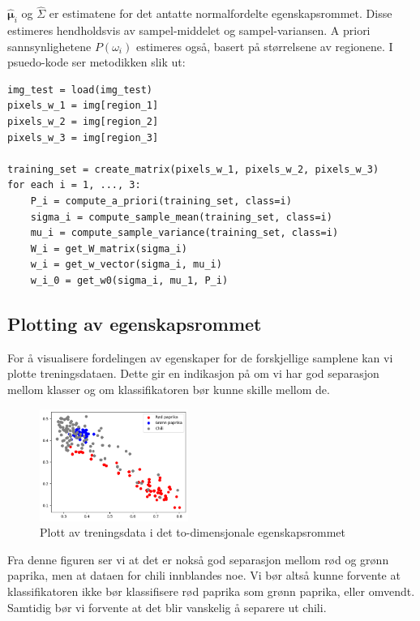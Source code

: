 \documentclass{article}
\begin{document}
$\hat{\pmb{\mu}}_i$ og $\hat{\Sigma}$ er estimatene for det antatte normalfordelte egenskapsrommet. Disse estimeres hendholdsvis av 
sampel-middelet og sampel-variansen. A priori sannsynlighetene $P(\omega_i)$ estimeres også, basert på størrelsene av regionene.
I psuedo-kode ser metodikken slik ut:
\begin{verbatim}
img_test = load(img_test)
pixels_w_1 = img[region_1]
pixels_w_2 = img[region_2]
pixels_w_3 = img[region_3]

training_set = create_matrix(pixels_w_1, pixels_w_2, pixels_w_3)
for each i = 1, ..., 3:
    P_i = compute_a_priori(training_set, class=i)
    sigma_i = compute_sample_mean(training_set, class=i)
    mu_i = compute_sample_variance(training_set, class=i)
    W_i = get_W_matrix(sigma_i)
    w_i = get_w_vector(sigma_i, mu_i)
    w_i_0 = get_w0(sigma_i, mu_1, P_i)
\end{verbatim}

\newpage
\subsection*{Plotting av egenskapsrommet}
For å visualisere fordelingen av egenskaper for de forskjellige samplene kan vi plotte
treningsdataen. Dette gir en indikasjon på om vi har god separasjon mellom klasser og om klassifikatoren
bør kunne skille mellom de.

\begin{figure}[h]
    \centering
    \includegraphics[width=4.84cm]{plott_paprika}
    \caption{Plott av treningsdata i det to-dimensjonale egenskapsrommet}
\end{figure}

Fra denne figuren ser vi at det er nokså god separasjon mellom rød og grønn paprika, men at dataen for chili 
innblandes noe. Vi bør altså kunne forvente at klassifikatoren ikke bør klassifisere rød paprika som grønn paprika, eller omvendt.
Samtidig bør vi forvente at det blir vanskelig å separere ut chili.
\end{document}
